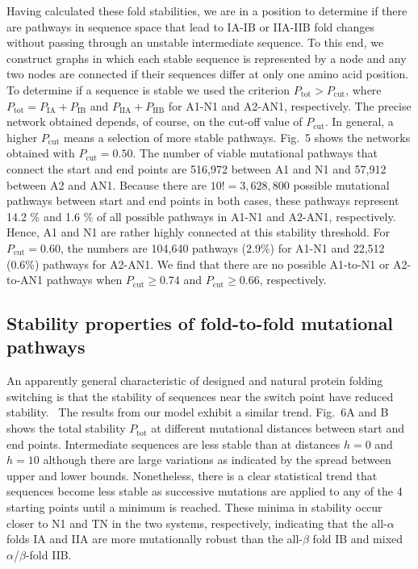 \documentclass[%
 aip,
rsi,%
 amsmath,amssymb,
 reprint,%
]{revtex4-1}
\newcommand {\Pcut}     	{{P_\mathrm{cut}}}
\newcommand {\Ptot}	{{P_\mathrm{tot}}}
\newcommand {\PaI}    	{{P_\mathrm{IA}}}
\newcommand {\PbI}    	{{P_\mathrm{IB}}}
\newcommand {\PaII}    	{{P_\mathrm{IIA}}}
\newcommand {\PbII}    	{{P_\mathrm{IIB}}}
\begin{document}
Having calculated these fold stabilities, we are in a position to determine if there are pathways in sequence space that lead to IA-IB or IIA-IIB fold changes without passing through an unstable intermediate sequence. To this end, we construct graphs in which each stable sequence is represented by a node and any two nodes are connected if their sequences differ at only one amino acid position. To determine if a sequence is stable we used the criterion $P_\mathrm{tot}>\Pcut$, where  $\Ptot = \PaI + \PbI$ and $\PaII + \PbII$ for A1-N1 and A2-AN1, respectively. The precise network obtained depends, of course, on the cut-off value of $\Pcut$. In general, a higher $\Pcut$ means a selection of more stable pathways. Fig.~5 shows the networks obtained with $\Pcut=0.50$. The number of viable mutational pathways that connect the start and end points are 516,972 between A1 and N1 and  57,912 between A2 and AN1. Because there are $10! =3,628,800$ possible mutational pathways between start and end points in both cases, these pathways represent 14.2 \% and 1.6 \% of all possible pathways in A1-N1 and A2-AN1, respectively. Hence, A1 and N1 are rather highly connected at this stability threshold. For $\Pcut=0.60$, the numbers are 104,640 pathways (2.9\%) for A1-N1 and 22,512 (0.6\%) pathways for A2-AN1. We find that there are no possible A1-to-N1 or A2-to-AN1 pathways when $\Pcut\ge0.74$ and $\Pcut\ge 0.66$, respectively. \\

\subsection{Stability properties of fold-to-fold mutational pathways}
\noindent 
An apparently general characteristic of designed and natural protein folding switching is that the stability of sequences near the switch point have reduced stability.~\cite{Bryan2010} The results from our model exhibit a similar trend. Fig.~6A and B shows the total stability $\Ptot$ at different mutational distances between start and end points. Intermediate sequences are less stable than at distances $h=0$ and $h=10$ although there are large variations as indicated by the spread between upper and lower bounds. Nonetheless, there is a clear statistical trend that sequences become less stable as successive mutations are applied to any of the 4 starting points until a minimum is reached. These minima in stability occur closer to N1 and TN in the two systems, respectively, indicating that the all-$\alpha$ folds IA and IIA are more mutationally robust than the all-$\beta$ fold IB and mixed $\alpha$/$\beta$-fold IIB. 
\end{document}
